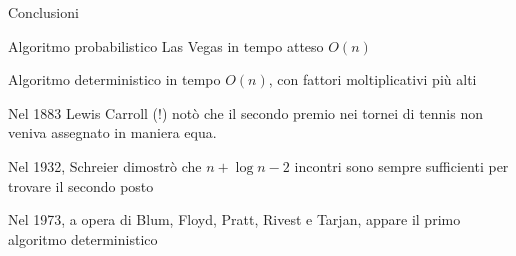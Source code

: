 \begin{frame}{Conclusioni}

\vspace{-9pt}
\begin{myboxtitle}
\BIL
\item Algoritmo probabilistico Las Vegas in tempo atteso $O(n)$
\item Algoritmo deterministico in tempo $O(n)$, con fattori moltiplicativi
  più alti
\EIL
\end{myboxtitle}


\begin{myboxtitle}
\BIL
\item Nel 1883 Lewis Carroll (!) notò che il secondo premio nei tornei di tennis non veniva assegnato in maniera equa.
\item Nel 1932, Schreier dimostrò che $n + \log n - 2$  incontri sono sempre sufficienti per trovare il secondo posto
\item Nel 1973, a opera di Blum, Floyd, Pratt, Rivest e Tarjan, appare il primo algoritmo deterministico
\EIL
\end{myboxtitle}
\end{frame}







